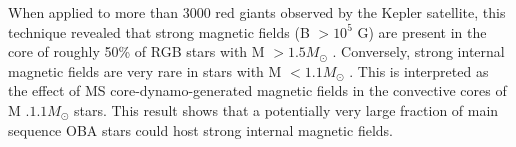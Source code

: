 When applied to more than 3000 red giants observed by the Kepler satellite, this technique revealed that
strong magnetic fields (B $> 10^5$ G) are present in the core of roughly 50\% of RGB stars with M $> 1.5M_\odot$ \citep{Stello_2016}.
Conversely, strong internal magnetic fields are very rare in stars with M $< 1.1M_\odot$ . This is interpreted as the
effect of MS core-dynamo-generated magnetic fields in the convective cores of M $. 1.1M_\odot$ stars.
This result shows that a potentially very large fraction of main sequence OBA stars could host strong internal magnetic fields.



